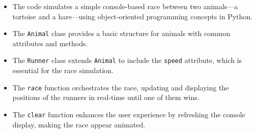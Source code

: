 \begin{homeworkProblem}
\begin{itemize}
  \item The code simulates a simple console-based race between two animals—a tortoise and a hare—using object-oriented programming concepts in Python.
  \item The \texttt{Animal} class provides a basic structure for animals with common attributes and methods.
  \item The \texttt{Runner} class extends \texttt{Animal} to include the \texttt{speed} attribute, which is essential for the race simulation.
  \item The \texttt{race} function orchestrates the race, updating and displaying the positions of the runners in real-time until one of them wins.
  \item The \texttt{clear} function enhances the user experience by refreshing the console display, making the race appear animated.
\end{itemize}

\end{homeworkProblem}




